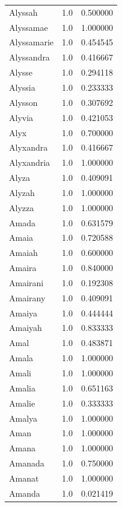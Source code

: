 \documentclass[
  letterpaper,
  DIV=11,
  numbers=noendperiod]{scrreprt}
\begin{document}
\begin{tabular}{lrr}
Alyssah         &   1.0 &   0.500000 \\
Alyssamae       &   1.0 &   1.000000 \\
Alyssamarie     &   1.0 &   0.454545 \\
Alyssandra      &   1.0 &   0.416667 \\
Alysse          &   1.0 &   0.294118 \\
Alyssia         &   1.0 &   0.233333 \\
Alysson         &   1.0 &   0.307692 \\
Alyvia          &   1.0 &   0.421053 \\
Alyx            &   1.0 &   0.700000 \\
Alyxandra       &   1.0 &   0.416667 \\
Alyxandria      &   1.0 &   1.000000 \\
Alyza           &   1.0 &   0.409091 \\
Alyzah          &   1.0 &   1.000000 \\
Alyzza          &   1.0 &   1.000000 \\
Amada           &   1.0 &   0.631579 \\
Amaia           &   1.0 &   0.720588 \\
Amaiah          &   1.0 &   0.600000 \\
Amaira          &   1.0 &   0.840000 \\
Amairani        &   1.0 &   0.192308 \\
Amairany        &   1.0 &   0.409091 \\
Amaiya          &   1.0 &   0.444444 \\
Amaiyah         &   1.0 &   0.833333 \\
Amal            &   1.0 &   0.483871 \\
Amala           &   1.0 &   1.000000 \\
Amali           &   1.0 &   1.000000 \\
Amalia          &   1.0 &   0.651163 \\
Amalie          &   1.0 &   0.333333 \\
Amalya          &   1.0 &   1.000000 \\
Aman            &   1.0 &   1.000000 \\
Amana           &   1.0 &   1.000000 \\
Amanada         &   1.0 &   0.750000 \\
Amanat          &   1.0 &   1.000000 \\
Amanda          &   1.0 &   0.021419 \\

\end{tabular}
\end{document}
